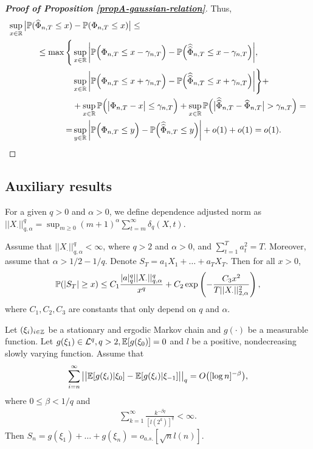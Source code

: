 \documentclass[a4paper,12pt]{article}
\newcommand{\doublehattwo}[1]{\widehat{\widehat{#1}}}
\begin{document}
\begin{proof}[\textnormal{\textbf{Proof of Proposition \ref{propA-gaussian-relation}}}]
Thus, 
\begin{align*}
\sup_{x \in \reals} \big| \pr(\widehat{\Phi}_{n, T} \le x) &- \pr(\Phi_{n,T} \le x) \big| \le \\
\le \max \Bigg\{ &\sup_{x \in \reals} \bigg| \pr\Big(\Phi_{n,T} \le x - \gamma_{n, T}\Big) -\pr\Big(\doublehattwo{\Phi}_{n,T} \le x - \gamma_{n, T}\Big)\bigg|, \\
&\sup_{x \in \reals} \bigg| \pr\Big(\Phi_{n,T} \le x + \gamma_{n, T}\Big) -\pr\Big(\doublehattwo{\Phi}_{n,T} \le x + \gamma_{n, T}\Big)\bigg| \Bigg\} + \\
&+\sup_{x\in \reals}\pr\Big(\big|\Phi_{n,T} - x \big| \le \gamma_{n, T}\Big) + \sup_{x\in\reals}\pr \Big(\big|\doublehattwo{\Phi}_{n,T} - \widehat{\Phi}_{n,T}\big| > \gamma_{n, T} \Big) = \\
=&\sup_{y \in \reals} \bigg| \pr\Big(\Phi_{n,T} \le y\Big) -\pr\Big(\doublehattwo{\Phi}_{n,T} \le y\Big)\bigg| + o(1) + o(1) = o(1).
\end{align*}
\end{proof}

\subsection*{Auxiliary results}
\begin{definitionA}\label{defA-DAN} For a given $q > 0$ and $\alpha > 0$, we define dependence adjusted norm as 
$||X_{\cdot}||^{q}_{q, \alpha} = \sup_{m\geq 0} (m+1)^{\alpha} \sum_{t=m}^{\infty} \delta_{q}(X, t)$.
\end{definitionA}

\begin{theoremA}{\cite{Wu2016}}\label{theo-wu}
Assume that $||X_{\cdot}||^{q}_{q, \alpha} < \infty$, where $q > 2$ and $\alpha >0$, and $\sum_{t=1}^T a_t^2 = T.$ Moreover, assume that $\alpha > 1/2 - 1/q$. Denote $S_T = a_1 X_1 + \ldots + a_T X_T$. Then for all $x>0$,
\begin{align*}
	\mathbb{P}(|S_T| \geq x) \leq C_1 \frac{|a|_{q}^{q}||X_{\cdot}||^{q}_{q, \alpha}  }{x^{q}} + C_2 \exp \left( - \frac{C_3 x^2} {T ||X_\cdot||^2_{2, \alpha}}\right),
\end{align*}
where $C_1, C_2, C_3$ are constants that only depend on $q$ and $\alpha$.
\end{theoremA}

\begin{theoremA}{\cite{Wu2007}}\label{theo-wu-2}
Let $(\xi_i)_{i \in \mathbb{Z}}$ be a stationary and ergodic Markov chain and $g(\cdot)$ be a measurable function. Let $g(\xi_1) \in \mathcal{L}^q, q > 2, \mathbb{E}[g(\xi_0)] = 0$ and $\mathit{l}$ be a positive, nondecreasing slowly varying function. Assume that $$ \sum_{i = n}^\infty \big|\big| \mathbb{E} [g(\xi_i)| \xi_0] - \mathbb{E} [g(\xi_i)| \xi_{-1}]\big|\big|_q =O\big([\log n]^{-\beta}\big),$$ where $0 \leq \beta<1/q$ and 
\begin{align*}
\sum_{k=1}^\infty \frac{k^{-\beta q}}{[l(2^k)]^q} < \infty.	
\end{align*}
Then $S_n = g(\xi_1) + \ldots + g(\xi_n) = o_{a.s.}[\sqrt{n}l(n)]$.
\end{theoremA}
\end{document}
